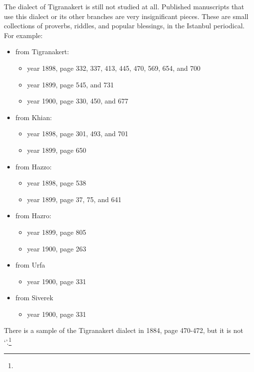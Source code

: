 

The dialect of Tigranakert is still not studied at all. Published manuscripts that use this dialect or its other branches are very insignificant pieces. These are small collections of proverbs, riddles, and popular blessings, in the Istanbul  periodical. For example:
\begin{itemize}
	\item from Tigranakert: 
	\begin{itemize}
		\item year 1898, page 332, 337, 413, 445, 470, 569, 654, and 700 
		\item year 1899, page 545, and 731 
		\item year 1900, page 330, 450, and 677 
	\end{itemize}
	\item from Khian: 
	\begin{itemize}
		\item year 1898, page 301, 493, and 701 
		\item year 1899, page 650 
	\end{itemize}
	\item from Hazzo: 
	\begin{itemize}
		\item year 1898, page 538 
		\item year 1899, page 37, 75, and 641 
	\end{itemize}
	\item from Hazro: 
	\begin{itemize}
		\item year 1899, page 805 
		\item year 1900, page 263 
	\end{itemize}
	\item from Urfa 
	\begin{itemize}
		\item year 1900, page 331 
	\end{itemize}
	\item from Siverek 
	\begin{itemize}
		\item year 1900, page 331 
	\end{itemize}
	
\end{itemize}

There is a sample of the Tigranakert dialect in  1884, page 470-472, but it is not `'.\footnote{}

